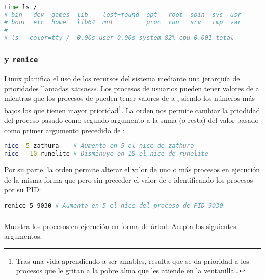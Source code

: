 \begin{lstlisting}[language=Bash]
time ls /
# bin   dev  games  lib    lost+found  opt   root  sbin  sys  usr
# boot  etc  home   lib64  mnt         proc  run   srv   tmp  var
#
# ls --color=tty /  0.00s user 0.00s system 82% cpu 0.001 total
\end{lstlisting}

\subsubsection{ y \texttt{renice}}

Linux planifica el uso de los recursos del sistema mediante una jerarquía de prioridades llamadas \emph{niceness}.
Los procesos de usuarios pueden tener valores  de  a  mientras que los procesos de  pueden tener valores de  a , siendo los números más bajos los que tienen mayor prioridad\footnote{Tras una vida aprendiendo a ser amables, resulta que se da prioridad a los procesos que le gritan a la pobre alma que les atiende en la ventanilla\ldots}.
La orden  nos permite cambiar la priodidad del proceso pasado como segundo argumento a la suma (o resta) del valor pasado como primer argumento precedido de \code{-}:

\begin{lstlisting}[language=Bash]
nice -5 zathura    # Aumenta en 5 el nice de zathura
nice --10 runelite # Disminuye en 10 el nice de runelite
\end{lstlisting}

Por su parte, la orden  permite alterar el valor de uno o más procesos en ejecución de la misma forma que  pero sin preceder el valor de \code{-} e identificando los procesos por su PID\@:

\begin{lstlisting}[language=Bash]
renice 5 9030 # Aumenta en 5 el nice del proceso de PID 9030
\end{lstlisting}

\subsubsection{}

Muestra los procesos en ejecución en forma de árbol.
Acepta los siguientes argumentos:

